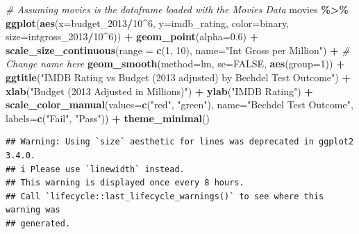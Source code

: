 \documentclass[
  b5paper]{book}
\newenvironment{Shaded}{\begin{snugshade}}{\end{snugshade}}
\newcommand{\AttributeTok}[1]{\textcolor[rgb]{0.13,0.29,0.53}{#1}}
\newcommand{\CommentTok}[1]{\textcolor[rgb]{0.56,0.35,0.01}{\textit{#1}}}
\newcommand{\ConstantTok}[1]{\textcolor[rgb]{0.56,0.35,0.01}{#1}}
\newcommand{\DecValTok}[1]{\textcolor[rgb]{0.00,0.00,0.81}{#1}}
\newcommand{\FloatTok}[1]{\textcolor[rgb]{0.00,0.00,0.81}{#1}}
\newcommand{\FunctionTok}[1]{\textcolor[rgb]{0.13,0.29,0.53}{\textbf{#1}}}
\newcommand{\NormalTok}[1]{#1}
\newcommand{\SpecialCharTok}[1]{\textcolor[rgb]{0.81,0.36,0.00}{\textbf{#1}}}
\newcommand{\StringTok}[1]{\textcolor[rgb]{0.31,0.60,0.02}{#1}}
\begin{document}
\begin{Shaded}
\begin{Highlighting}[]
\CommentTok{\# Assuming movies is the dataframe loaded with the Movies Data}
\NormalTok{movies }\SpecialCharTok{\%\textgreater{}\%}
  \FunctionTok{ggplot}\NormalTok{(}\FunctionTok{aes}\NormalTok{(}\AttributeTok{x=}\NormalTok{budget\_2013}\SpecialCharTok{/}\DecValTok{10}\SpecialCharTok{\^{}}\DecValTok{6}\NormalTok{, }\AttributeTok{y=}\NormalTok{imdb\_rating, }\AttributeTok{color=}\NormalTok{binary, }\AttributeTok{size=}\NormalTok{intgross\_2013}\SpecialCharTok{/}\DecValTok{10}\SpecialCharTok{\^{}}\DecValTok{6}\NormalTok{)) }\SpecialCharTok{+}
  \FunctionTok{geom\_point}\NormalTok{(}\AttributeTok{alpha=}\FloatTok{0.6}\NormalTok{) }\SpecialCharTok{+}
  \FunctionTok{scale\_size\_continuous}\NormalTok{(}\AttributeTok{range =} \FunctionTok{c}\NormalTok{(}\DecValTok{1}\NormalTok{, }\DecValTok{10}\NormalTok{), }\AttributeTok{name=}\StringTok{"Int Gross per Million"}\NormalTok{) }\SpecialCharTok{+}  \CommentTok{\# Change name here}
  \FunctionTok{geom\_smooth}\NormalTok{(}\AttributeTok{method=}\StringTok{\textquotesingle{}lm\textquotesingle{}}\NormalTok{, }\AttributeTok{se=}\ConstantTok{FALSE}\NormalTok{, }\FunctionTok{aes}\NormalTok{(}\AttributeTok{group=}\DecValTok{1}\NormalTok{)) }\SpecialCharTok{+}
  \FunctionTok{ggtitle}\NormalTok{(}\StringTok{"IMDB Rating vs Budget (2013 adjusted) by Bechdel Test Outcome"}\NormalTok{) }\SpecialCharTok{+}
  \FunctionTok{xlab}\NormalTok{(}\StringTok{"Budget (2013 Adjusted in Millions)"}\NormalTok{) }\SpecialCharTok{+}
  \FunctionTok{ylab}\NormalTok{(}\StringTok{"IMDB Rating"}\NormalTok{) }\SpecialCharTok{+}
  \FunctionTok{scale\_color\_manual}\NormalTok{(}\AttributeTok{values=}\FunctionTok{c}\NormalTok{(}\StringTok{"red"}\NormalTok{, }\StringTok{"green"}\NormalTok{), }\AttributeTok{name=}\StringTok{"Bechdel Test Outcome"}\NormalTok{, }\AttributeTok{labels=}\FunctionTok{c}\NormalTok{(}\StringTok{"Fail"}\NormalTok{, }\StringTok{"Pass"}\NormalTok{)) }\SpecialCharTok{+}
  \FunctionTok{theme\_minimal}\NormalTok{()}
\end{Highlighting}
\end{Shaded}

\begin{verbatim}
## Warning: Using `size` aesthetic for lines was deprecated in ggplot2 3.4.0.
## i Please use `linewidth` instead.
## This warning is displayed once every 8 hours.
## Call `lifecycle::last_lifecycle_warnings()` to see where this warning was
## generated.
\end{verbatim}
\end{document}
